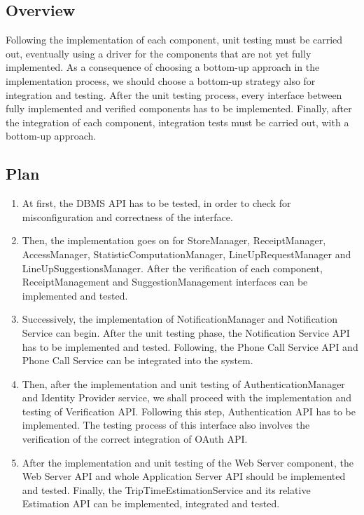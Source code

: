 \documentclass[../../main.tex]{subfiles}
\begin{document}
\subsection{Overview}

Following the implementation of each component, unit testing must be carried out, eventually using a driver for the components that are not yet fully implemented. 
As a consequence of choosing a bottom-up approach in the implementation process, we should choose a bottom-up strategy also for integration and testing. 
After the unit testing process, every interface between fully implemented and verified components has to be implemented. 
Finally, after the integration of each component, integration tests must be carried out, with a bottom-up approach. 

\subsection{Plan}

\begin{enumerate}

	\item At first, the DBMS API has to be tested, in order to check for misconfiguration and correctness of the interface.

	\item Then, the implementation goes on for StoreManager, ReceiptManager, AccessManager, StatisticComputationManager, LineUpRequestManager and LineUpSuggestionsManager. 
	After the verification of each component, ReceiptManagement and SuggestionManagement interfaces can be implemented and tested.

	\item Successively, the implementation of NotificationManager and Notification Service can begin. 
	After the unit testing phase, the Notification Service API has to be implemented and tested. 
	Following, the Phone Call Service API and Phone Call Service can be integrated into the system.

	\item Then, after the implementation and unit testing of AuthenticationManager and Identity Provider service, we shall proceed with the implementation and testing of Verification API. 
	Following this step, Authentication API has to be implemented. The testing process of this interface also involves the verification of the correct integration of OAuth API.

	\item After the implementation and unit testing of the Web Server component, the Web Server API and whole Application Server API should be implemented and tested. 
	Finally, the TripTimeEstimationService and its relative Estimation API can be implemented, integrated and tested.

\end{enumerate}
\end{document}
